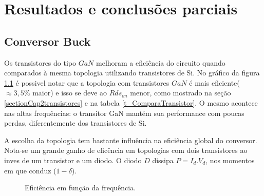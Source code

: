 \chapter{Resultados e conclusões parciais}
\label{chapterResultados}

\section{Conversor Buck}
\par Os transistores do tipo $GaN$ melhoram a eficiência do circuito quando comparados à mesma topologia utilizando transistores de Si. No gráfico da figura \ref{GrafEficienciaFrequencia} é possivel notar que a topologia com transistores $GaN$ é mais eficiente($\approx 3,5\%$ maior) e isso se deve ao $Rds_{on}$ menor, como mostrado na seção \ref{sectionCap2transistores} e na tabela \ref{t_ComparaTransistor}. O mesmo acontece nas altas frequências: o transitor GaN mantém sua performance com poucas perdas, diferentemente dos transistores de Si.  
\par A escolha da topologia tem bastante influência na eficiência global do conversor. Nota-se um grande ganho de eficência em topologias com dois transistores ao inves de um transistor e um diodo. O diodo $D$ dissipa $P=I_d.V_d$, nos momentos em que conduz ($1-\delta$).
\begin{center}
\begin{figure}[H]
\caption{Eficiência em função da frequência.}
\label{GrafEficienciaFrequencia}
\end{figure}
\end{center}
